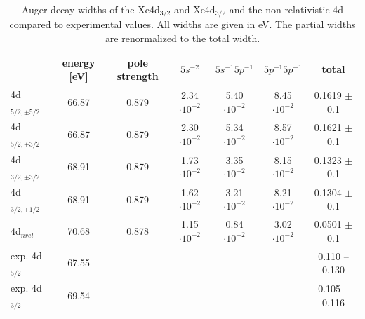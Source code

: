 \begin{table}[h]
 \centering
 \footnotesize
 \caption{Auger decay widths of the Xe4d$_{3/2}$ and Xe4d$_{3/2}$
          and the non-relativistic
          4d compared to experimental values\cite{Ausmees99}.
          All widths are given in \unit{eV}.
          The partial widths are renormalized to the total width.}
 \begin{tabular}{lcccccc}
   \toprule
               & energy [\unit{eV}] & pole strength & $5s^{-2}$          & $5s^{-1}5p^{-1}$   & $5p^{-1}5p^{-1}$   & total \\
   \midrule                                                                                     
     4d$_{5/2,\pm 5/2}$ &  66.87    &   0.879       & 2.34$\cdot10^{-2}$ & 5.40$\cdot10^{-2}$ & 8.45$\cdot10^{-2}$ & 0.1619 $\pm$ 0.1\\
     4d$_{5/2,\pm 3/2}$ &  66.87    &   0.879       & 2.30$\cdot10^{-2}$ & 5.34$\cdot10^{-2}$ & 8.57$\cdot10^{-2}$ & 0.1621 $\pm$ 0.1\\
     4d$_{3/2,\pm 3/2}$ &  68.91    &   0.879       & 1.73$\cdot10^{-2}$ & 3.35$\cdot10^{-2}$ & 8.15$\cdot10^{-2}$ & 0.1323 $\pm$ 0.1\\
     4d$_{3/2,\pm 1/2}$ &  68.91    &   0.879       & 1.62$\cdot10^{-2}$ & 3.21$\cdot10^{-2}$ & 8.21$\cdot10^{-2}$ & 0.1304 $\pm$ 0.1\\
     4d$_{nrel}$        &  70.68    &   0.878       & 1.15$\cdot10^{-2}$ & 0.84$\cdot10^{-2}$ & 3.02$\cdot10^{-2}$ & 0.0501 $\pm$ 0.1\\
     exp. 4d$_{5/2}$    &  67.55    &               &                    &                    &                    & 0.110 -- 0.130  \\
     exp. 4d$_{3/2}$    &  69.54    &               &                    &                    &                    & 0.105 -- 0.116  \\
   \bottomrule                                                                                 
 \end{tabular}                                                                                 
 \label{table:xe_auger_4d_rates}
\end{table}
